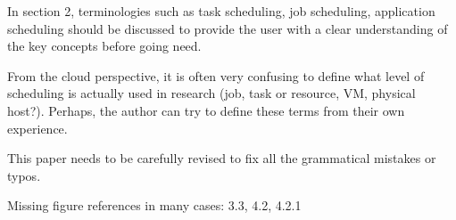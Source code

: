 In section 2, terminologies such as task scheduling, job scheduling, application scheduling should be discussed to provide the user with a clear understanding of the key concepts before going need.


From the cloud perspective, it is often very confusing to define what level of scheduling is actually used in research (job, task or resource, VM, physical host?). Perhaps, the author can try to define these terms from their own experience.


This paper needs to be carefully revised to fix all the grammatical mistakes or typos.


Missing figure references in many cases: 3.3, 4.2, 4.2.1




